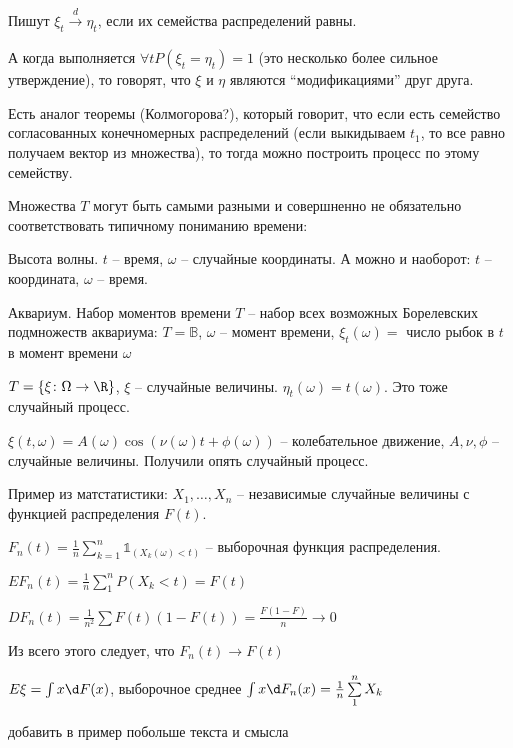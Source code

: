 \begin{Def}
Пишут $\xi_t \xrightarrow[]{d} \eta_t$, если их семейства распределений равны.

А когда выполняется $\forall t P(\xi_t = \eta_t) = 1$ (это несколько более сильное утверждение), то говорят, что $\xi$ и $\eta$ являются ``модификациями'' друг друга.
\end{Def}


Есть аналог теоремы (Колмогорова?), который говорит, что если есть семейство согласованных конечномерных распределений (если выкидываем $t_1$, то все равно получаем вектор из множества), 
то тогда можно построить процесс по этому семейству. \TODO

Множества $T$ могут быть самыми разными и совершненно не обязательно соответствовать типичному пониманию времени:
\begin{exmp}
Высота волны. $t$ -- время, $\omega$ -- случайные координаты. А можно и наоборот: $t$ -- координата, $\omega$ -- время.
\end{exmp}
\begin{exmp}
Аквариум. Набор моментов времени $T$ -- набор всех возможных Борелевских подмножеств аквариума: $T = \mathbb{B}$, $\omega$ -- момент времени, $\xi_t(\omega) =$ число рыбок в $t$ в момент времени $\omega$
\end{exmp}
\begin{exmp}
$T = \{\xi \colon \Omega\to \R\}$, $\xi$ -- случайные величины. $\eta_t(\omega) = t(\omega)$. Это тоже случайный процесс.
\end{exmp}
\begin{exmp}
$\xi(t, \omega) = A(\omega) \cos (\nu(\omega) t + \phi(\omega))$ -- колебательное движение, $A, \nu, \phi$ -- случайные величины. Получили опять случайный процесс.
\end{exmp}
\begin{exmp}
Пример из матстатистики: $X_1, \dots, X_n$ -- независимые случайные величины с функцией распределения $F(t)$. 

$F_n(t) = \frac1n \sum\limits_{k=1}^n \mathbb{1}_{(X_k(\omega) < t)}$ -- выборочная функция распределения.

$EF_n(t) = \frac1n \sum\limits_1^n P(X_k < t) = F(t)$

$DF_n(t) = \frac{1}{n^2} \sum F(t)(1 - F(t)) = \frac{F (1 - F)}{n} \to 0$

Из всего этого следует, что $F_n(t) \to F(t)$

$E\xi = \int x \d F(x)$, выборочное среднее $\int x \d F_n(x) = \frac1n \sum\limits_1^n X_k$

\TODO добавить в пример побольше текста и смысла \TODO

\end{exmp}


